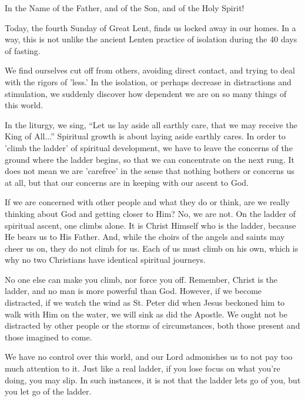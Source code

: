 \documentclass[twoside, letterpaper, 12pt]{report}
\begin{document}
\begin{maybetwocolumns}

In the Name of the Father, and of the Son, and of the Holy Spirit!

Today, the fourth Sunday of Great Lent, finds us locked away in our homes.
In a way, this is not unlike the ancient Lenten practice of isolation during the 40 days of fasting.

We find ourselves cut off from others, avoiding direct contact,
and trying to deal with the rigors of 'less.' In the isolation,
or perhaps decrease in distractions and stimulation,
we suddenly discover how dependent we are on so many things of this world.

In the liturgy, we sing, “Let us lay aside all earthly care,
that we may receive the King of All...” Spiritual growth is about laying aside earthly cares.
In order to 'climb the ladder' of spiritual development,
we have to leave the concerns of the ground where the ladder begins,
so that we can concentrate on the next rung.
It does not mean we are 'carefree' in the sense that nothing bothers or concerns us at all,
but that our concerns are in keeping with our ascent to God.

If we are concerned with other people and what they do or think,
are we really thinking about God and getting closer to Him? No, we are not.
On the ladder of spiritual ascent, one climbs alone.
It is Christ Himself who is the ladder, because He bears us to His Father.
And, while the choirs of the angels and saints may cheer us on, they do not climb for us.
Each of us must climb on his own, which is why no two Christians have identical spiritual journeys.

No one else can make you climb, nor force you off.
Remember, Christ is the ladder, and no man is more powerful than God.
However, if we become distracted,
if we watch the wind as St. Peter did when Jesus beckoned him to walk with Him on the water,
we will sink as did the Apostle.
We ought not be distracted by other people or the storms of circumstances,
both those present and those imagined to come.

We have no control over this world, and our Lord admonishes us to not pay too much attention to it.
Just like a real ladder, if you lose focus on what you're doing, you may slip.
In such instances, it is not that the ladder lets go of you, but you let go of the ladder.


\end{maybetwocolumns}
\end{document}
